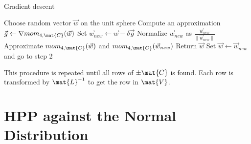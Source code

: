 \begin{algorithm}
\caption{Gradient descent}
\begin{algorithmic}[1]
        \State Choose random vector $\vec{w}$ on the unit sphere
        \State Compute an approximation $\vec{g} \gets \nabla mom_{4, \mat{C}}(\vec{w})$
        \State Set $\vec{w}_{new} \gets \vec{w} - \delta \vec{g} $
        \State Normalize $\vec{w}_{new}$ as $\frac{\vec{w}_{new}}{\lVert \vec{w}_{new} \rVert}$
        \State Approximate $mom_{4, \mat{C}}(\vec{w})$ and $mom_{4, \mat{C}}(\vec{w}_{new})$
            \State Return $\vec{w}$
        \Else{}
        \State Set $\vec{w} \gets \vec{w}_{new}$ and go to step 2
        \EndIf
\end{algorithmic}
\end{algorithm}
This procedure is repeated until all rows of $\pm \mat{C}$ is found. Each row is transformed by $\mat{L}^{-1}$ to get the row in $\mat{V}$.
\section{HPP against the Normal Distribution}


